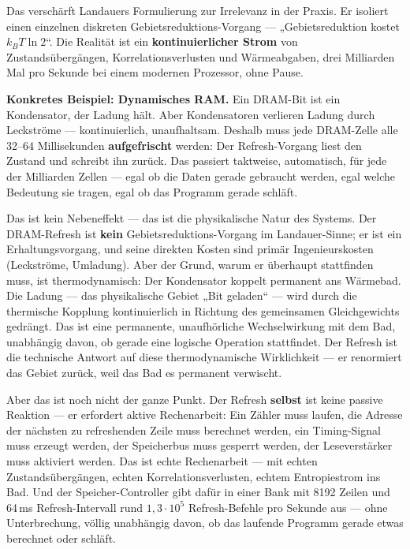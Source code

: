Das verschärft Landauers Formulierung zur Irrelevanz in der Praxis. Er isoliert
einen einzelnen diskreten Gebietsreduktions-Vorgang --- „Gebietsreduktion kostet
$k_B T \ln 2$“. Die Realität ist ein \textbf{kontinuierlicher Strom} von
Zustandsübergängen, Korrelationsverlusten und Wärmeabgaben, drei Milliarden Mal
pro Sekunde bei einem modernen Prozessor, ohne Pause.

\textbf{Konkretes Beispiel: Dynamisches RAM.} Ein DRAM-Bit ist ein Kondensator,
der Ladung hält. Aber Kondensatoren verlieren Ladung durch Leckströme ---
kontinuierlich, unaufhaltsam. Deshalb muss jede DRAM-Zelle alle 32--64
Millisekunden \textbf{aufgefrischt} werden: Der Refresh-Vorgang liest den Zustand
und schreibt ihn zurück. Das passiert taktweise, automatisch, für jede der
Milliarden Zellen --- egal ob die Daten gerade gebraucht werden, egal welche
Bedeutung sie tragen, egal ob das Programm gerade schläft.

Das ist kein Nebeneffekt --- das ist die physikalische Natur des Systems. Der
DRAM-Refresh ist \textbf{kein} Gebietsreduktions-Vorgang im Landauer-Sinne; er ist
ein Erhaltungsvorgang, und seine direkten Kosten sind primär Ingenieurskosten
(Leckströme, Umladung). Aber der Grund, warum er überhaupt stattfinden muss, ist
thermodynamisch: Der Kondensator koppelt permanent ans Wärmebad. Die Ladung ---
das physikalische Gebiet „Bit geladen“ --- wird durch die thermische Kopplung
kontinuierlich in Richtung des gemeinsamen Gleichgewichts gedrängt. Das ist eine
permanente, unaufhörliche Wechselwirkung mit dem Bad, unabhängig davon, ob gerade
eine logische Operation stattfindet. Der Refresh ist die technische Antwort auf
diese thermodynamische Wirklichkeit --- er renormiert das Gebiet zurück, weil das
Bad es permanent verwischt.

Aber das ist noch nicht der ganze Punkt. Der Refresh \textbf{selbst} ist keine
passive Reaktion --- er erfordert aktive Rechenarbeit: Ein Zähler muss laufen, die
Adresse der nächsten zu refreshenden Zeile muss berechnet werden, ein
Timing-Signal muss erzeugt werden, der Speicherbus muss gesperrt werden, der
Leseverstärker muss aktiviert werden. Das ist echte Rechenarbeit --- mit echten
Zustandsübergängen, echten Korrelationsverlusten, echtem Entropiestrom ins Bad.
Und der Speicher-Controller gibt dafür in einer Bank mit 8192 Zeilen und 64\,ms
Refresh-Intervall rund $1{,}3\cdot10^{5}$ Refresh-Befehle pro Sekunde aus --- ohne
Unterbrechung, völlig unabhängig davon, ob das laufende Programm gerade etwas
berechnet oder schläft.

